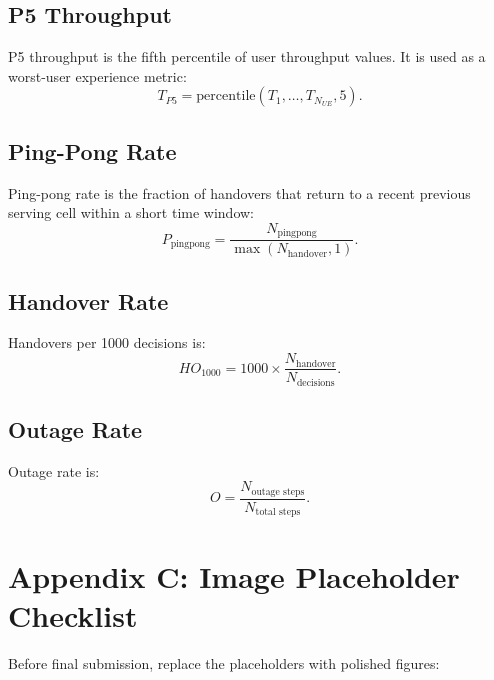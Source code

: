\documentclass[12pt,a4paper]{report}
\begin{document}
\section{P5 Throughput}
P5 throughput is the fifth percentile of user throughput values. It is used as a worst-user experience metric:
\begin{equation}
    T_{P5} = \mathrm{percentile}(T_1,\dots,T_{N_{UE}}, 5).
\end{equation}

\section{Ping-Pong Rate}
Ping-pong rate is the fraction of handovers that return to a recent previous serving cell within a short time window:
\begin{equation}
    P_{\text{pingpong}} = \frac{N_{\text{pingpong}}}{\max(N_{\text{handover}},1)}.
\end{equation}

\section{Handover Rate}
Handovers per 1000 decisions is:
\begin{equation}
    HO_{1000} = 1000 \times \frac{N_{\text{handover}}}{N_{\text{decisions}}}.
\end{equation}

\section{Outage Rate}
Outage rate is:
\begin{equation}
    O = \frac{N_{\text{outage steps}}}{N_{\text{total steps}}}.
\end{equation}

\chapter{Appendix C: Image Placeholder Checklist}
Before final submission, replace the placeholders with polished figures:
\end{document}
